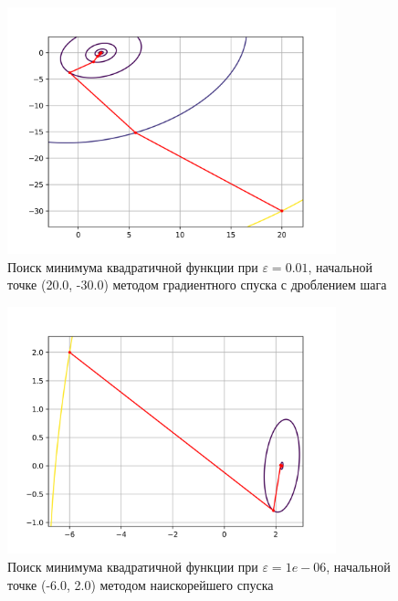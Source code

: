             \begin{figure}[H]
	        \centering
	        \includegraphics[width=0.85\textwidth]{Метод градиентного спуска с дробным шагом, eps 0.01, start = (20.00, -30.00), Квадратичная функция}%
	        \caption{Поиск минимума квадратичной функции при $\varepsilon = 0.01$, начальной точке (20.0, -30.0) методом градиентного спуска с дроблением шага}
	        \vspace*{-1.2cm}
            \end{figure}
            
            \begin{figure}[H]
	        \centering
	        \includegraphics[width=0.85\textwidth]{Метод наискорейшего спуска, eps 1e-06, start = (-6.000000, 2.000000), Квадратичная функция}%
	        \caption{Поиск минимума квадратичной функции при $\varepsilon = 1e-06$, начальной точке (-6.0, 2.0) методом наискорейшего спуска}
	        \vspace*{-1.2cm}
            \end{figure}
            
